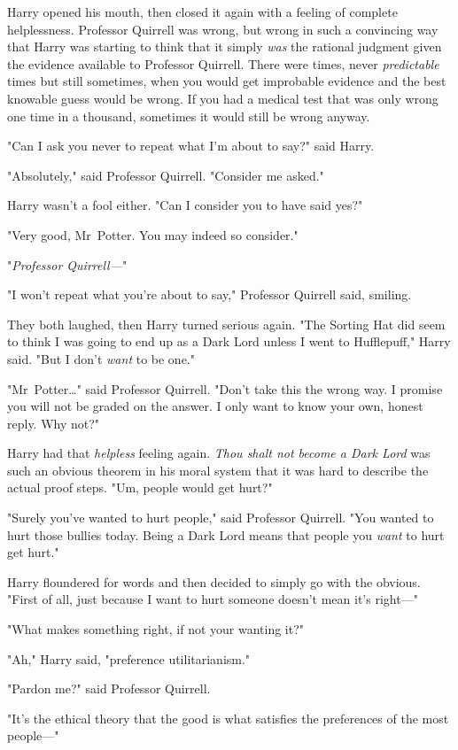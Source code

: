Harry opened his mouth, then closed it again with a feeling of complete
helplessness. Professor Quirrell was wrong, but wrong in such a convincing way
that Harry was starting to think that it simply \emph{was} the rational
judgment given the evidence available to Professor Quirrell. There were times,
never \emph{predictable} times but still sometimes, when you would get
improbable evidence and the best knowable guess would be wrong. If you had a
medical test that was only wrong one time in a thousand, sometimes it would
still be wrong anyway.

"Can I ask you never to repeat what I'm about to say?" said Harry.

"Absolutely," said Professor Quirrell. "Consider me asked."

Harry wasn't a fool either. "Can I consider you to have said yes?"

"Very good, Mr~Potter. You may indeed so consider."

"\emph{Professor Quirrell---}"

"I won't repeat what you're about to say," Professor Quirrell said, smiling.

They both laughed, then Harry turned serious again. "The Sorting Hat did seem
to think I was going to end up as a Dark Lord unless I went to Hufflepuff,"
Harry said. "But I don't \emph{want} to be one."

"Mr~Potter…" said Professor Quirrell. "Don't take this the wrong way. I
promise you will not be graded on the answer. I only want to know your own,
honest reply. Why not?"

Harry had that \emph{helpless} feeling again. \emph{Thou shalt not become a
Dark Lord} was such an obvious theorem in his moral system that it was hard to
describe the actual proof steps. "Um, people would get hurt?"

"Surely you've wanted to hurt people," said Professor Quirrell. "You wanted to
hurt those bullies today. Being a Dark Lord means that people you \emph{want}
to hurt get hurt."

Harry floundered for words and then decided to simply go with the obvious.
"First of all, just because I want to hurt someone doesn't mean it's right---"

"What makes something right, if not your wanting it?"

"Ah," Harry said, "preference utilitarianism."

"Pardon me?" said Professor Quirrell.

"It's the ethical theory that the good is what satisfies the preferences of the
most people---"


